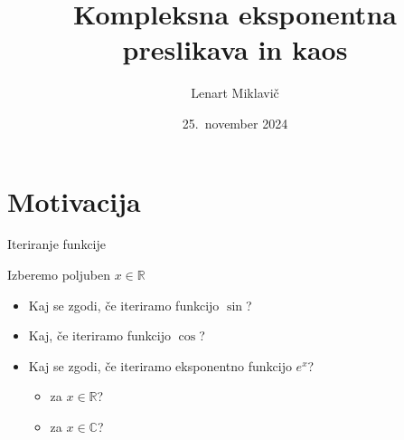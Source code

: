 \documentclass{beamer}
\title{Kompleksna eksponentna preslikava in kaos}
\author[Lenart Miklavič]{Lenart Miklavič}
\institute[FMF]{Fakulteta za matematiko in fiziko}
\date{25.~november 2024}
\newcommand{\RR}{\mathbb{R}}
\newcommand{\CC}{\mathbb{C}}
\theoremstyle{definition}
\theoremstyle{plain}
\begin{document}
\maketitle

\section{Motivacija}

\begin{frame}{Iteriranje funkcije}

  Izberemo poljuben \(x \in \RR\) \pause

  \begin{itemize}
    \item Kaj se zgodi, če iteriramo funkcijo \(\sin\)? \pause
    \item Kaj, če iteriramo funkcijo \(\cos\)? \pause
    \item Kaj se zgodi, če iteriramo eksponentno funkcijo \(e^x\)? \pause
      \begin{itemize}
        \item za \(x \in \RR\)? \pause
        \item za \(x \in \CC\)?
      \end{itemize}
  \end{itemize}

  
\end{frame}


\end{document}
